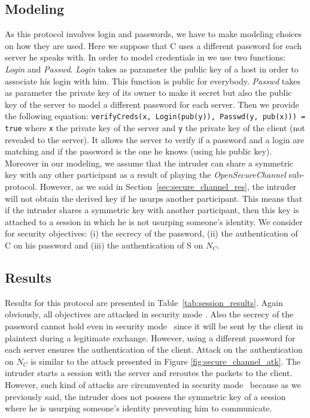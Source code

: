 \subsection{Modeling}

As this protocol involves login and passwords, we have to make
modeling choices on how they are used.  Here we suppose that C uses a
different password for each server he speaks with.  In order to model
credentials in \proverif we use two functions: {\em Login} and {\em
  Passwd}.  {\em Login} takes as parameter the public key of a host in
order to associate his login with him. This function is public for
everybody.  {\em Passwd} takes as parameter the private key of its
owner to make it secret but also the public key of the server to model
a different password for each server.  Then we provide the following
equation: \texttt{verifyCreds(x, Login(pub(y)), Passwd(y, pub(x))) =
  true} where \texttt{x} the private key of the server and \texttt{y}
the private key of the client (not revealed to the server).  It allows
the server to verify if a password and a login are matching and if the
password is the one he knows (using his public key).  Moreover in our
modeling, we assume that the intruder can share a symmetric key with
any other participant as a result of playing the {\em
  OpenSecureChannel} sub-protocol.  However, as we said in
Section~\ref{sec:secure_channel_res}, the intruder will not obtain the
derived key if he usurps another participant.  This means that if the
intruder shares a symmetric key with another participant, then this
key is attached to a session in which he is not usurping someone's
identity.  We consider for security objectives: (i) the secrecy of the
password, (ii) the authentication of C on his password and (iii) the
authentication of S on $N_{C}$.

\subsection{Results}

Results for this protocol are presented in Table~\ref{tab:session_results}.
Again obviously, all objectives are attacked in security mode \smn.
Also the secrecy of the password cannot hold even in security mode \sms~since
it will be sent by the client in plaintext during a legitimate exchange.
However, using a different password for each server ensures the authentication
of the client.
Attack on the authentication on $N_{C}$ is similar to the attack presented in
Figure \ref{fig:secure_channel_atk}.
The intruder starts a session with the server and reroutes the packets to the
client.
However, such kind of attacks are circumvented in security mode \smse~because
as we previously said, the intruder does not possess the symmetric key of a
session where he is usurping someone's identity preventing him to communicate.

